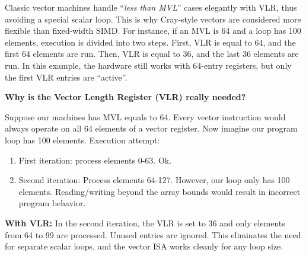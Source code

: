 \highspace
Classic vector machines handle ``\emph{less than MVL}'' cases elegantly with VLR, thus avoiding a special scalar loop. This is why Cray-style vectors are considered more flexible than fixed-width SIMD. For instance, if an MVL is 64 and a loop has 100 elements, execution is divided into two steps. First, VLR is equal to 64, and the first 64 elements are run. Then, VLR is equal to 36, and the last 36 elements are run. In this example, the hardware still works with 64-entry registers, but only the first VLR entries are ``active''.

\highspace
\begin{flushleft}
    \textcolor{Green3}{ \textbf{Why is the Vector Length Register (VLR) really needed?}}
\end{flushleft}
Suppose our machines has MVL equals to 64. Every vector instruction would always operate on all 64 elements of a vector register. Now imagine our program loop has 100 elements. Execution attempt:
\begin{enumerate}
    \item First iteration: process elements 0-63. Ok.
    \item Second iteration: Process elements 64-127. However, our loop only has 100 elements. Reading/writing beyond the array bounds would result in incorrect program behavior.
\end{enumerate}
\textbf{With VLR:} In the second iteration, the VLR is set to 36 and only elements from 64 to 99 are processed. Unused entries are ignored. This eliminates the need for separate scalar loops, and the vector ISA works cleanly for any loop size.

